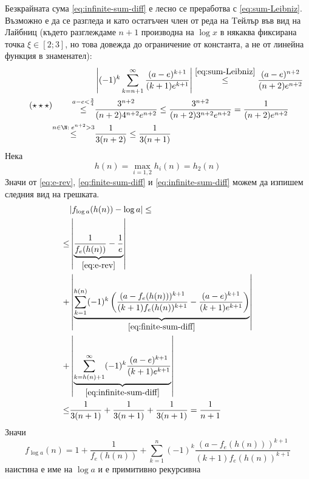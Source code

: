 \begin{solution}
    Безкрайната сума \eqref{eq:infinite-sum-diff} е лесно се преработва с \eqref{eq:sum-Leibniz}. Възможно е да се разгледа и като остатъчен член от реда на Tейлър във вид на Лайбниц (където разглеждаме $n+1$ производна на $\log x$ в някаква фиксирана точка $\xi \in [2; 3]$, но това довежда до ограничение от константа, а не от линейна функция в знаменател):
    \begin{equation} \label{eq:infinite-sum-diff} \tag{$\star\star\star$}
        \begin{split}
            & \left| (-1)^k \sum_{k=n+1}^\infty \frac{(a-e)^{k+1}}{(k+1)e^{k+1}} \right| \overset{\eqref{eq:sum-Leibniz}}{\leq} \frac{(a - e)^{n+2}}{(n+2)e^{n+2}} \\
            \overset{a - e < \frac{3}{4}}{\leq} & \frac{3^{n+2}}{(n+2)4^{n+2}e^{n+2}} \leq \frac{3^{n+2}}{(n+2)3^{n+2}e^{n+2}} = \frac{1}{(n+2)e^{n+2}} \\
            \overset{n\in \N:\; e^{n+2} > 3}{\leq} & \frac{1}{3(n+2)} \leq \frac{1}{3(n+1)}
        \end{split}
    \end{equation}
    Нека
    \begin{equation*}
        h(n) = \max\limits_{i=1,2} h_i(n) = h_2(n)
    \end{equation*}
    Значи от \eqref{eq:e-rev}, \eqref{eq:finite-sum-diff} и \eqref{eq:infinite-sum-diff} можем да изпишем следния вид на грешката.
    \begin{equation}
    \begin{split}
        & |f_{\log a}(h(n)) - \log a| \leq \\
        \leq & \left| \underbrace{\frac{1}{f_e(h(n))} - \frac{1}{e}}_{\eqref{eq:e-rev}} \right| \\
        + & \left| \underbrace{\sum_{k=1}^{h(n)} (-1)^{k} \left(\frac{(a-f_e(h(n)))^{k+1}}{(k+1)f_e(h(n))^{k+1}} - \frac{(a-e)^{k+1}}{(k+1)e^{k+1}}\right)}_{\eqref{eq:finite-sum-diff}} \right| \\ 
        + & \left| \underbrace{\sum_{k=h(n)+1}^\infty (-1)^k \frac{(a-e)^{k+1}}{(k+1)e^{k+1}}}_{\eqref{eq:infinite-sum-diff}} \right| \\
        \leq & \frac{1}{3(n+1)} + \frac{1}{3(n+1)} + \frac{1}{3(n+1)} = \frac{1}{n+1}
    \end{split}
    \end{equation}
    Значи 
    \begin{equation}
        f_{\log a}(n) = 1 + \frac{1}{f_e(h(n))} + \sum_{k=1}^n (-1)^{k} \frac{(a-f_e(h(n)))^{k+1}}{(k+1)f_e(h(n))^{k+1}}
    \end{equation}
    наистина е име на $\log a$ и е примитивно рекурсивна
\end{solution}